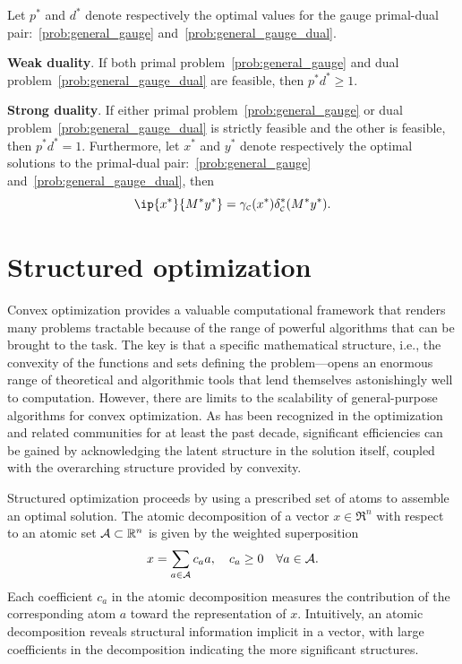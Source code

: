 \begin{theorem} 
    Let $p^*$ and $d^*$ denote respectively the optimal values for the gauge primal-dual pair:~\eqref{prob:general_gauge} and~\eqref{prob:general_gauge_dual}. 
    \item \textbf{Weak duality}. If both primal problem~\eqref{prob:general_gauge} and dual problem~\eqref{prob:general_gauge_dual} are feasible, then $p^* d^* \geq 1$. 
    \item \textbf{Strong duality}. If either primal problem~\eqref{prob:general_gauge} or dual problem~\eqref{prob:general_gauge_dual} is strictly feasible and the other is feasible, then $p^* d^* = 1$. Furthermore, let $x^*$ and $y^*$ denote respectively the optimal solutions to the primal-dual pair:~\eqref{prob:general_gauge} and~\eqref{prob:general_gauge_dual}, then 
    \[\ip{x^*}{M^*y^*} = \gauge\Cs(x^*)\delta\Cs^*(M^*y^*).\]
    
\end{theorem}

\section{Structured optimization} \label{sec:1-3}

Convex optimization provides a valuable computational framework that renders many problems tractable because of the range of powerful algorithms that can be brought to the task. The key is that a specific mathematical structure, i.e., the convexity of the functions and sets defining the problem—opens an enormous range of theoretical and algorithmic tools that lend themselves astonishingly well to computation. However, there are limits to the scalability of general-purpose algorithms for convex optimization. As has been recognized in the optimization and related communities for at least the past decade, significant efficiencies can be gained by acknowledging the latent structure in the solution itself, coupled with the overarching structure provided by convexity.

Structured optimization proceeds by using a prescribed set of atoms to assemble an optimal solution. The atomic decomposition of a vector $x\in\Re^n$ with respect to an atomic set
$\mathcal{A}\subset\mathbb{R}^n$ is given by the weighted superposition
\begin{equation} \label{eq:atomic-decomp}
  x = \sum_{a\in\mathcal{A}} c_a a, \quad c_a\ge0 \quad \forall a\in\mathcal{A}.
\end{equation}
Each coefficient $c_a$ in the atomic decomposition measures the contribution of
the corresponding atom $a$ toward the representation of $x$. Intuitively, an
atomic decomposition reveals structural information implicit in a vector, with
large coefficients in the decomposition indicating the more significant
structures.

